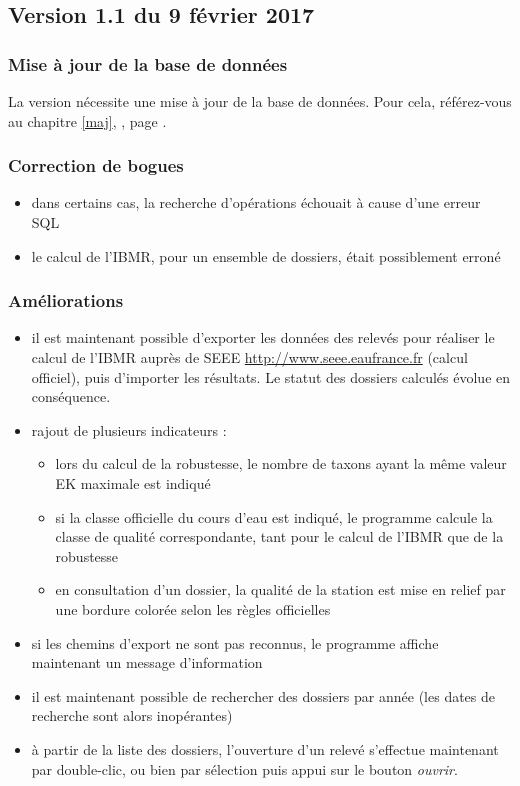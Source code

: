 \subsection{Version 1.1 du 9 février 2017}
\subsubsection{Mise à jour de la base de données}
La version nécessite une mise à jour de la base de données. Pour cela, référez-vous au chapitre \ref{maj}, \textit{}, page \pageref{maj}.

\subsubsection{Correction de bogues}
\begin{itemize}
\item dans certains cas, la recherche d'opérations échouait à cause d'une erreur SQL
\item le calcul de l'IBMR, pour un ensemble de dossiers, était possiblement erroné

\end{itemize}

\subsubsection{Améliorations}
\begin{itemize}
\item il est maintenant possible d'exporter les données des relevés pour réaliser le calcul de l'IBMR auprès de SEEE \url{http://www.seee.eaufrance.fr} (calcul officiel), puis d'importer les résultats. Le statut des dossiers calculés évolue en conséquence.
\item rajout de plusieurs indicateurs : 
\begin{itemize}
\item lors du calcul de la robustesse, le nombre de taxons ayant la même valeur EK maximale est indiqué
\item si la classe officielle du cours d'eau est indiqué, le programme calcule la classe de qualité correspondante, tant pour le calcul de l'IBMR que de la robustesse
\item en consultation d'un dossier, la qualité de la station est mise en relief par une bordure colorée selon les règles officielles
\end{itemize}
\item si les chemins d'export ne sont pas reconnus, le programme affiche maintenant un message d'information
\item il est maintenant possible de rechercher des dossiers par année (les dates de recherche sont alors inopérantes)
\item à partir de la liste des dossiers, l'ouverture d'un relevé s'effectue maintenant par double-clic, ou bien par sélection puis appui sur le bouton \textit{ouvrir}.
\end{itemize}